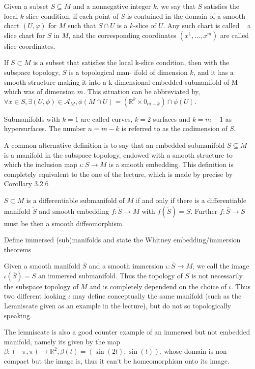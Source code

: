 Given a subset \(S \subseteq M\) and a nonnegative integer \(k\), we say that \(S\) satisfies the local \(k\)-slice condition, 
if each point of \(S\) is contained in the domain of a smooth chart \((U, \varphi)\) for \(M\) such that \(S \cap U\) is a \(k\)-slice of \(U\). Any such chart is called   
a slice chart for \(S\) in \(M\), and the corresponding coordinates \((x^1, \dots, x^m)\) are called slice coordinates.

If \( S \subset M \) is a subset that satisfies the local k-slice condition, then with the subspace topology, \( S \) is a topological man-
ifold of dimension \( k \), and it has a smooth structure making it into a k-dimensional embedded submanifold of M which was of dimension \( m \).
This situation can be abbreviated by, \( \forall x \in S, \exists (U, \phi) \in \mathcal{A}_M, \phi(M \cap U) = (\mathbb{R}^k \times 0_{m-k}) \cap \phi(U) \).

Submanifolds with \( k=1 \) are called curves, \( k=2 \) surfaces and \( k = m - 1 \) as hypersurfaces. The number \( n = m - k \) is referred to as the codimension of \( S \).

A common alternative definition is to say that an embedded submanifold \( S \subseteq M \) is a manifold in the subspace topology, endowed with a smooth
structure to which the inclusion map \( \iota : S \to M \) is a smooth embedding. 
This definition is completely equivalent to the one of the lecture, which is made by precise by Corollary 3.2.6

\( S \subset M \) is a differentiable submanifold of \( M \) if and only if there is a differentiable manifold \( \tilde{S} \) and smooth embedding
\( f : \tilde{S} \to M \) with \( f(\tilde{S}) = S \). Further \( f : \bar{S} \to S \) must be then a smooth diffeomorphism.

Define immersed (sub)manifolds and state the Whitney embedding/immersion theorems

Given a smooth manifold \( \bar{S} \) and a smooth immersion \( \iota : \bar{S} \to M \), we call the image \( \iota(\bar{S}) = S \) an immersed submanifold.
Thus the topology of \( S \) is not necessarily the subspace topology of \( M \) and is completely dependend on the choice of \( \iota \).
Thus two different looking \( \iota \) may define conceptually the same manifold (such as the Lemniscate given as an example in the lecture), but do not so
topologically speaking.

The lemniscate is also a good counter example of an immersed but not embedded manifold, namely its given by the map \(\beta: (-\pi, \pi) \to \mathbb{R}^2, \beta(t) = (\sin(2t), \sin(t))\), whose domain is non compact but the image is, thus it can't be homeomorphism onto its image.

